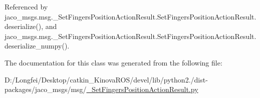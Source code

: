Referenced by jaco\+\_\+msgs.\+msg.\+\_\+\+Set\+Fingers\+Position\+Action\+Result.\+Set\+Fingers\+Position\+Action\+Result.\+deserialize(), and jaco\+\_\+msgs.\+msg.\+\_\+\+Set\+Fingers\+Position\+Action\+Result.\+Set\+Fingers\+Position\+Action\+Result.\+deserialize\+\_\+numpy().



The documentation for this class was generated from the following file\+:\begin{DoxyCompactItemize}
\item 
D\+:/\+Longfei/\+Desktop/catkin\+\_\+\+Kinova\+R\+O\+S/devel/lib/python2./dist-\/packages/jaco\+\_\+msgs/msg/\hyperlink{__SetFingersPositionActionResult_8py}{\+\_\+\+Set\+Fingers\+Position\+Action\+Result.\+py}\end{DoxyCompactItemize}
